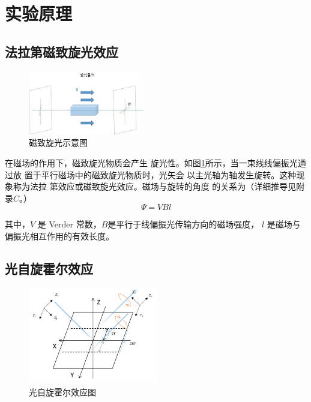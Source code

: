 \documentclass[12pt]{ctexart}
\numberwithin{equation}{section} %
\begin{document}
\section{实验原理}
\subsection{法拉第磁致旋光效应}
\begin{figure}[H] %
    \centering %
    \includegraphics[width=0.45\textwidth]{磁致旋光.jpg} %
    \caption{磁致旋光示意图} %
    \label{fig:磁致旋光示意图} %
\end{figure}


在磁场的作用下，磁致旋光物质会产生
旋光性。如图\ref{fig:磁致旋光示意图}所示，当一束线线偏振光通过放
置于平行磁场中的磁致旋光物质时，光矢会
以主光轴为轴发生旋转。这种现象称为法拉
第效应或磁致旋光效应。磁场与旋转的角度
的关系为（详细推导见附录$C$。）
$$\Psi=VBl$$


其中，$V$ 是 Verder 常数，$B $是平行于线偏振光传输方向的磁场强度，
$l$ 是磁场与偏振光相互作用的有效长度。
\subsection{光自旋霍尔效应}
\begin{figure}[H] %
    \centering %
    \includegraphics[width=0.5\textwidth]{光自旋霍尔效应示意图.png} %
    \caption{光自旋霍尔效应图} %
    \label{fig:光自旋霍尔效应图} %
\end{figure}
\end{document}
